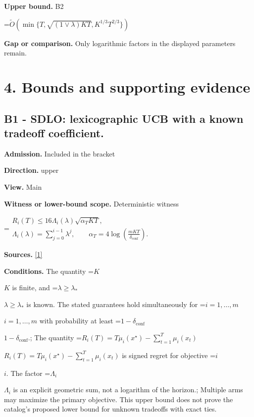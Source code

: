 \documentclass[10pt,a4paper]{article}
\newcommand{\AtlasMath}[1]{\par\begingroup\centering\setbox0=\hbox{$\displaystyle #1$}\ifdim\wd0>1.4\linewidth\typeout{ATLAS WIDE FORMULA: \the\wd0}\fi\ifdim\wd0>\linewidth\resizebox{\linewidth}{!}{\box0}\else\box0\fi\par\endgroup}
\newcommand{\AtlasInlineMath}[1]{\begingroup\setbox0=\hbox{$#1$}\ifdim\wd0>.4\linewidth\endgroup\AtlasMath{#1}\else\endgroup$#1$\fi}
\begin{document}
\textbf{Upper bound.} B2



\AtlasMath{\widetilde O\!\left(\min\{T,\sqrt{(1\vee\lambda)KT},K^{1/3}T^{2/3}\}\right)}


\textbf{Gap or comparison.} Only logarithmic factors in the displayed parameters remain.



\section{4. Bounds and supporting evidence}


\subsection{B1 - SDLO: lexicographic UCB with a known tradeoff coefficient.}


\textbf{Admission.} Included in the bracket



\textbf{Direction.} upper



\textbf{View.} Main



\textbf{Witness or lower-bound scope.} Deterministic witness



\AtlasMath{\begin{gathered}R_i(T)\le16\Lambda_i(\lambda)\sqrt{\alpha_TKT},\\ \Lambda_i(\lambda)=\sum_{j=0}^{i-1}\lambda^j,\qquad \alpha_T=4\log\!\left(\frac{mKT}{\delta_{\mathrm{conf}}}\right).\end{gathered}}


\textbf{Sources.} \href{https://jmlr.org/papers/volume26/24-1047/24-1047.pdf}{[1]}



\textbf{Conditions.} The quantity \AtlasInlineMath{K} is finite, and \AtlasInlineMath{\lambda\ge\lambda_*} is known. The stated guarantees hold simultaneously for \AtlasInlineMath{i=1,\ldots,m} with probability at least \AtlasInlineMath{1-\delta_{\mathrm{conf}}}.; The quantity \AtlasInlineMath{R_i(T)=T\mu_i(x^\star)-\sum_{t=1}^T\mu_i(x_t)} is signed regret for objective \AtlasInlineMath{i}. The factor \AtlasInlineMath{\Lambda_i} is an explicit geometric sum, not a logarithm of the horizon.; Multiple arms may maximize the primary objective. This upper bound does not prove the catalog's proposed lower bound for unknown tradeoffs with exact ties.
\end{document}
